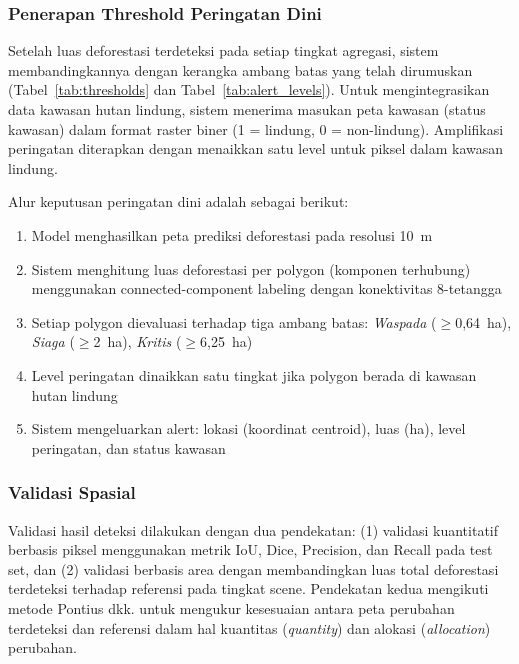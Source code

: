 \documentclass[12pt,a4paper]{article}
\begin{document}
\subsubsection{Penerapan Threshold Peringatan Dini}
\label{subsubsec:threshold}

Setelah luas deforestasi terdeteksi pada setiap tingkat agregasi,
sistem membandingkannya dengan kerangka ambang batas yang telah
dirumuskan (Tabel~\ref{tab:thresholds} dan
Tabel~\ref{tab:alert_levels}). Untuk mengintegrasikan data
kawasan hutan lindung, sistem menerima masukan peta kawasan
(status kawasan) dalam format raster biner (1 = lindung,
0 = non-lindung). Amplifikasi peringatan diterapkan dengan
menaikkan satu level untuk piksel dalam kawasan lindung.

Alur keputusan peringatan dini adalah sebagai berikut:

\begin{enumerate}[nosep]
    \item Model menghasilkan peta prediksi deforestasi pada
          resolusi 10~m
    \item Sistem menghitung luas deforestasi per polygon
          (komponen terhubung) menggunakan connected-component
          labeling dengan konektivitas 8-tetangga
    \item Setiap polygon dievaluasi terhadap tiga ambang batas:
          \textit{Waspada} ($\geq$0,64~ha), \textit{Siaga}
          ($\geq$2~ha), \textit{Kritis} ($\geq$6,25~ha)
    \item Level peringatan dinaikkan satu tingkat jika polygon
          berada di kawasan hutan lindung
    \item Sistem mengeluarkan alert: lokasi (koordinat centroid),
          luas (ha), level peringatan, dan status kawasan
\end{enumerate}

\subsubsection{Validasi Spasial}
\label{subsubsec:validasi}

Validasi hasil deteksi dilakukan dengan dua pendekatan:
(1) validasi kuantitatif berbasis piksel menggunakan metrik
IoU, Dice, Precision, dan Recall pada test set, dan
(2) validasi berbasis area dengan membandingkan luas total
deforestasi terdeteksi terhadap referensi pada tingkat scene.
Pendekatan kedua mengikuti metode Pontius dkk.
\cite{pontius2001roc, pontius2017methods} untuk mengukur
kesesuaian antara peta perubahan terdeteksi dan referensi
dalam hal kuantitas (\textit{quantity}) dan alokasi
(\textit{allocation}) perubahan.
\end{document}

